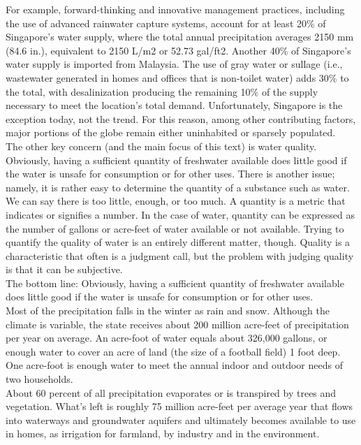 \documentclass{article}
\begin{document}
For example, forward-thinking and innovative management practices, including the use of advanced rainwater capture systems, account for at least 20\% of Singapore’s water supply, where the total annual precipitation averages 2150 mm (84.6 in.), equivalent to 2150 L/m2 or 52.73 gal/ft2. Another 40\% of Singapore’s water supply is imported from Malaysia. The use of gray water or sullage (i.e., wastewater generated in homes and offices that is non-toilet water) adds 30\% to the total, with desalinization producing the remaining 10\% of the supply necessary to meet the location’s total demand. Unfortunately, Singapore is the exception today, not the trend. For this reason, among other contributing factors, major portions of the globe remain either uninhabited or sparsely populated.\\

The other key concern (and the main focus of this text) is water quality. Obviously,
having a sufficient quantity of freshwater available does little good if the water is
unsafe for consumption or for other uses. There is another issue; namely, it is rather
easy to determine the quantity of a substance such as water. We can say there is
too little, enough, or too much. A quantity is a metric that indicates or signifies a
number. In the case of water, quantity can be expressed as the number of gallons or
acre-feet of water available or not available. Trying to quantify the quality of water
is an entirely different matter, though. Quality is a characteristic that often is a judgment
call, but the problem with judging quality is that it can be subjective.\\

The bottom line: Obviously, having a sufficient quantity of freshwater available
does little good if the water is unsafe for consumption or for other uses.\\

Most of the precipitation falls in the winter as rain and snow. Although the climate is variable, the state receives about 200 million acre-feet of precipitation per year on average. An acre-foot of water equals about 326,000 gallons, or enough water to cover an acre of land (the size of a football field) 1 foot deep. One acre-foot is enough water to meet the annual indoor and outdoor needs of two households.\\

About 60 percent of all precipitation evaporates or is transpired by trees and vegetation. What’s left is roughly 75 million acre-feet per average year that flows into waterways and groundwater aquifers and ultimately becomes available to use in homes, as irrigation for farmland, by industry and in the environment.\\
\end{document}
